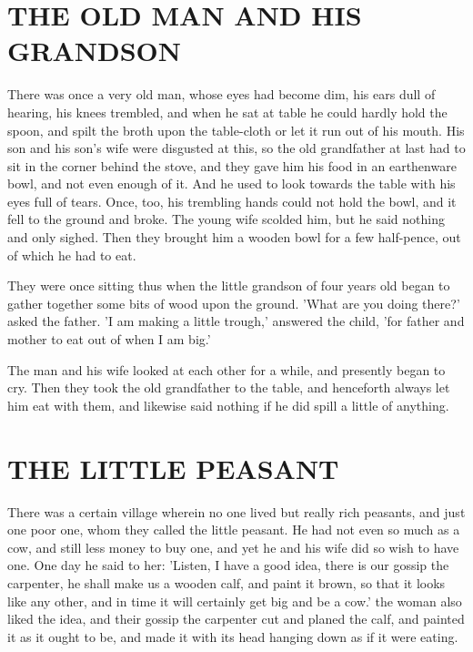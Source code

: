 \documentclass[12pt]{book}
\begin{document}
\chapter{THE OLD MAN AND HIS GRANDSON}

There was once a very old man, whose eyes had become dim, his ears
dull of hearing, his knees trembled, and when he sat at table he could
hardly hold the spoon, and spilt the broth upon the table-cloth or let
it run out of his mouth. His son and his son's wife were disgusted at
this, so the old grandfather at last had to sit in the corner behind
the stove, and they gave him his food in an earthenware bowl, and not
even enough of it. And he used to look towards the table with his eyes
full of tears. Once, too, his trembling hands could not hold the bowl,
and it fell to the ground and broke. The young wife scolded him, but
he said nothing and only sighed. Then they brought him a wooden bowl
for a few half-pence, out of which he had to eat.

They were once sitting thus when the little grandson of four years old
began to gather together some bits of wood upon the ground. 'What are
you doing there?' asked the father. 'I am making a little trough,'
answered the child, 'for father and mother to eat out of when I am
big.'

The man and his wife looked at each other for a while, and presently
began to cry. Then they took the old grandfather to the table, and
henceforth always let him eat with them, and likewise said nothing if
he did spill a little of anything.



\chapter{THE LITTLE PEASANT}

There was a certain village wherein no one lived but really rich
peasants, and just one poor one, whom they called the little peasant.
He had not even so much as a cow, and still less money to buy one, and
yet he and his wife did so wish to have one. One day he said to her:
'Listen, I have a good idea, there is our gossip the carpenter, he
shall make us a wooden calf, and paint it brown, so that it looks like
any other, and in time it will certainly get big and be a cow.' the
woman also liked the idea, and their gossip the carpenter cut and
planed the calf, and painted it as it ought to be, and made it with
its head hanging down as if it were eating.
\end{document}
